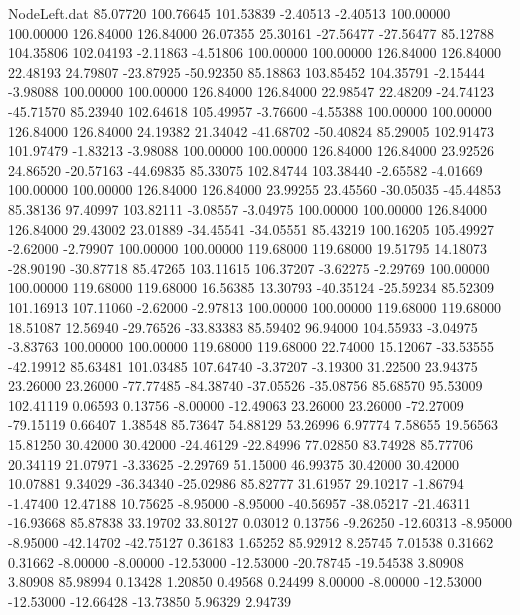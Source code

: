 \begin{filecontents}{NodeLeft.dat}
  85.07720  100.76645  101.53839    -2.40513   -2.40513  100.00000  100.00000  126.84000  126.84000   26.07355   25.30161  -27.56477  -27.56477
  85.12788  104.35806  102.04193    -2.11863   -4.51806  100.00000  100.00000  126.84000  126.84000   22.48193   24.79807  -23.87925  -50.92350
  85.18863  103.85452  104.35791    -2.15444   -3.98088  100.00000  100.00000  126.84000  126.84000   22.98547   22.48209  -24.74123  -45.71570
  85.23940  102.64618  105.49957    -3.76600   -4.55388  100.00000  100.00000  126.84000  126.84000   24.19382   21.34042  -41.68702  -50.40824
  85.29005  102.91473  101.97479    -1.83213   -3.98088  100.00000  100.00000  126.84000  126.84000   23.92526   24.86520  -20.57163  -44.69835
  85.33075  102.84744  103.38440    -2.65582   -4.01669  100.00000  100.00000  126.84000  126.84000   23.99255   23.45560  -30.05035  -45.44853
  85.38136   97.40997  103.82111    -3.08557   -3.04975  100.00000  100.00000  126.84000  126.84000   29.43002   23.01889  -34.45541  -34.05551
  85.43219  100.16205  105.49927    -2.62000   -2.79907  100.00000  100.00000  119.68000  119.68000   19.51795   14.18073  -28.90190  -30.87718
  85.47265  103.11615  106.37207    -3.62275   -2.29769  100.00000  100.00000  119.68000  119.68000   16.56385   13.30793  -40.35124  -25.59234
  85.52309  101.16913  107.11060    -2.62000   -2.97813  100.00000  100.00000  119.68000  119.68000   18.51087   12.56940  -29.76526  -33.83383
  85.59402   96.94000  104.55933    -3.04975   -3.83763  100.00000  100.00000  119.68000  119.68000   22.74000   15.12067  -33.53555  -42.19912
  85.63481  101.03485  107.64740    -3.37207   -3.19300   31.22500   23.94375   23.26000   23.26000  -77.77485  -84.38740  -37.05526  -35.08756
  85.68570   95.53009  102.41119     0.06593    0.13756   -8.00000  -12.49063   23.26000   23.26000  -72.27009  -79.15119    0.66407    1.38548
  85.73647   54.88129   53.26996     6.97774    7.58655   19.56563   15.81250   30.42000   30.42000  -24.46129  -22.84996   77.02850   83.74928
  85.77706   20.34119   21.07971    -3.33625   -2.29769   51.15000   46.99375   30.42000   30.42000   10.07881    9.34029  -36.34340  -25.02986
  85.82777   31.61957   29.10217    -1.86794   -1.47400   12.47188   10.75625   -8.95000   -8.95000  -40.56957  -38.05217  -21.46311  -16.93668
  85.87838   33.19702   33.80127     0.03012    0.13756   -9.26250  -12.60313   -8.95000   -8.95000  -42.14702  -42.75127    0.36183    1.65252
  85.92912    8.25745    7.01538     0.31662    0.31662   -8.00000   -8.00000  -12.53000  -12.53000  -20.78745  -19.54538    3.80908    3.80908
  85.98994    0.13428    1.20850     0.49568    0.24499    8.00000   -8.00000  -12.53000  -12.53000  -12.66428  -13.73850    5.96329    2.94739

\end{filecontents}
